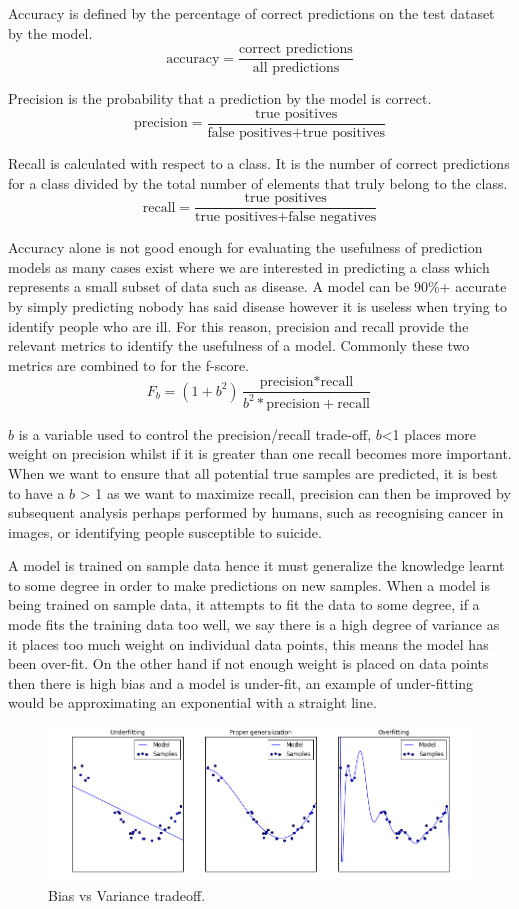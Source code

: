 Accuracy is defined by the percentage of correct predictions on the test dataset by the model. \[ \text{accuracy} = \frac{\text{correct predictions}}{\text{all predictions}}\]

Precision is the probability that a prediction by the model is correct.
 \[ \text{precision} = \frac{\text{true positives}}{\text{false positives}+\text{true positives}}\]

Recall is calculated with respect to a class. It is the number of correct predictions for a class divided by the total number of elements that truly belong to the class.
\[ \text{recall} = \frac{\text{true positives}}{\text{true positives}+\text{false negatives}}\]

Accuracy alone is not good enough for evaluating the usefulness of prediction models as many cases exist where we are interested in predicting a class which represents a small subset of data such as disease. A model can be 90\%+ accurate by simply predicting nobody has said disease however it is useless when trying to identify people who are ill. For this reason, precision and recall provide the relevant metrics to identify the usefulness of a model. Commonly these two metrics are combined to for the f-score.
\[F_{b}=(1+b^2)\frac{\text{precision}*\text{recall}}{b^2*\text{precision}+\text{recall}}\]

\(b\) is a variable used to control the precision/recall trade-off, \(b\)<1 places more weight on precision whilst if it is greater than one recall becomes more important. When we want to ensure that all potential true samples are predicted, it is best to have a \(b\) > 1 as we want to maximize recall, precision can then be improved by subsequent analysis perhaps performed by humans, such as recognising cancer in images, or identifying people susceptible to suicide.

A model is trained on sample data hence it must generalize the knowledge learnt to some degree in order to make predictions on new samples. When a model is being trained on sample data, it attempts to fit the data to some degree, if a mode fits the training data too well, we say there is a high degree of variance as it places too much weight on individual data points, this means the model has been over-fit. On the other hand if not enough weight is placed on data points then there is high bias and a model is under-fit, an example of under-fitting would be approximating an exponential with a straight line. 
\begin{figure}[h]
\centering
 \includegraphics[width=\linewidth]{images/Selection_019}
 \caption{Bias vs Variance tradeoff.}
 \label{fig:bvtradeoff}
\end{figure}

